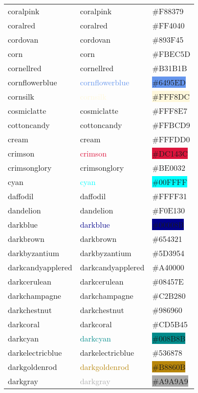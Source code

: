 \documentclass[
]{article}
\begin{document}
\begin{longtable}[]{@{}lll@{}}
coralpink & \textcolor{coralpink}{coralpink} &
\colorbox{coralpink}{\#F88379}\tabularnewline
coralred & \textcolor{coralred}{coralred} &
\colorbox{coralred}{\#FF4040}\tabularnewline
cordovan & \textcolor{cordovan}{cordovan} &
\colorbox{cordovan}{\#893F45}\tabularnewline
corn & \textcolor{corn}{corn} & \colorbox{corn}{\#FBEC5D}\tabularnewline
cornellred & \textcolor{cornellred}{cornellred} &
\colorbox{carnelian}{\#B31B1B}\tabularnewline
cornflowerblue & \textcolor{cornflowerblue}{cornflowerblue} &
\colorbox{cornflowerblue}{\#6495ED}\tabularnewline
cornsilk & \textcolor{cornsilk}{cornsilk} &
\colorbox{cornsilk}{\#FFF8DC}\tabularnewline
cosmiclatte & \textcolor{cosmiclatte}{cosmiclatte} &
\colorbox{cosmiclatte}{\#FFF8E7}\tabularnewline
cottoncandy & \textcolor{cottoncandy}{cottoncandy} &
\colorbox{cottoncandy}{\#FFBCD9}\tabularnewline
cream & \textcolor{cream}{cream} &
\colorbox{cream}{\#FFFDD0}\tabularnewline
crimson & \textcolor{crimson}{crimson} &
\colorbox{crimson}{\#DC143C}\tabularnewline
crimsonglory & \textcolor{crimsonglory}{crimsonglory} &
\colorbox{crimsonglory}{\#BE0032}\tabularnewline
cyan & \textcolor{cyan}{cyan} & \colorbox{aqua}{\#00FFFF}\tabularnewline
daffodil & \textcolor{daffodil}{daffodil} &
\colorbox{daffodil}{\#FFFF31}\tabularnewline
dandelion & \textcolor{dandelion}{dandelion} &
\colorbox{dandelion}{\#F0E130}\tabularnewline
darkblue & \textcolor{darkblue}{darkblue} &
\colorbox{darkblue}{\#00008B}\tabularnewline
darkbrown & \textcolor{darkbrown}{darkbrown} &
\colorbox{darkbrown}{\#654321}\tabularnewline
darkbyzantium & \textcolor{darkbyzantium}{darkbyzantium} &
\colorbox{darkbyzantium}{\#5D3954}\tabularnewline
darkcandyapplered & \textcolor{darkcandyapplered}{darkcandyapplered} &
\colorbox{darkcandyapplered}{\#A40000}\tabularnewline
darkcerulean & \textcolor{darkcerulean}{darkcerulean} &
\colorbox{darkcerulean}{\#08457E}\tabularnewline
darkchampagne & \textcolor{darkchampagne}{darkchampagne} &
\colorbox{darkchampagne}{\#C2B280}\tabularnewline
darkchestnut & \textcolor{darkchestnut}{darkchestnut} &
\colorbox{darkchestnut}{\#986960}\tabularnewline
darkcoral & \textcolor{darkcoral}{darkcoral} &
\colorbox{darkcoral}{\#CD5B45}\tabularnewline
darkcyan & \textcolor{darkcyan}{darkcyan} &
\colorbox{darkcyan}{\#008B8B}\tabularnewline
darkelectricblue & \textcolor{darkelectricblue}{darkelectricblue} &
\colorbox{darkelectricblue}{\#536878}\tabularnewline
darkgoldenrod & \textcolor{darkgoldenrod}{darkgoldenrod} &
\colorbox{darkgoldenrod}{\#B8860B}\tabularnewline
darkgray & \textcolor{darkgray}{darkgray} &
\colorbox{darkgray}{\#A9A9A9}\tabularnewline

\end{longtable}
\end{document}
